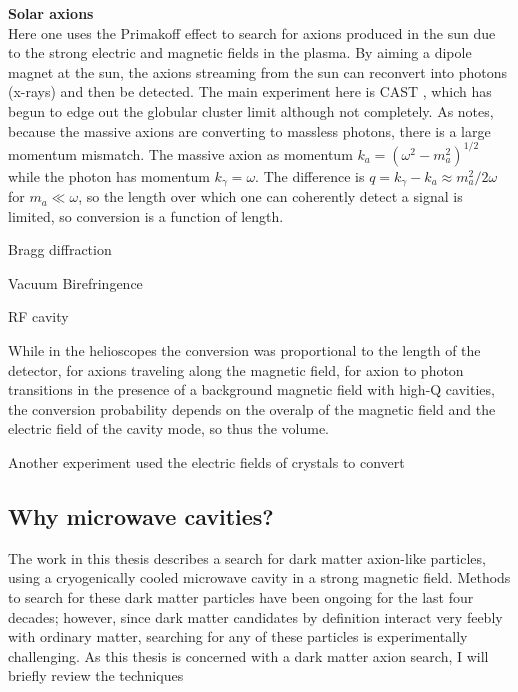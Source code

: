 \documentclass[12pt,twosides]{book}
\begin{document}
\begin{description}

\item \textbf{Solar axions} \hfill \\

Here one uses the Primakoff effect to search for axions produced in the sun due to the strong electric and magnetic fields in the plasma. By aiming a dipole magnet at the sun, the axions streaming from the sun can reconvert into photons (x-rays) and then be detected. The main experiment here is CAST \cite{cast11}, which has begun to edge out the globular cluster limit although not completely.  As \cite{raffelt08} notes, because the massive axions are converting to massless photons, there is a large momentum mismatch. The massive axion as momentum $k_a = (\omega^2 - m_a^2)^{1/2}$ while the photon has momentum $k_\gamma = \omega$. The difference is $q = k_\gamma - k_a \approx m_a^2/2\omega$ for $m_a \ll \omega$, so the length over which one can coherently detect a signal is limited, so conversion is a function of length.

\item{Bragg diffraction}

\item{Vacuum Birefringence}

\item{RF cavity}

While in the helioscopes the conversion was proportional to the length of the detector, for axions traveling along the magnetic field, for axion to photon transitions in the presence of a background magnetic field with high-Q cavities, the conversion probability depends on the overalp of the magnetic field and the electric field of the cavity mode, so thus the volume.

Another experiment used the electric fields of crystals to convert 
\subsection{Why microwave cavities?}
The work in this thesis describes a search for dark matter axion-like particles, using a cryogenically cooled microwave cavity in a strong magnetic field. Methods to search for these dark matter particles have been ongoing for the last four decades; however, since dark matter candidates by definition interact very feebly with ordinary matter, searching for any of these particles is experimentally challenging.  As this thesis is concerned with a dark matter axion search, I will briefly review the techniques


\end{description}
\end{document}
